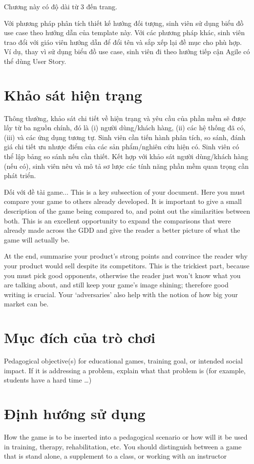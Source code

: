 \documentclass[../DoAn.tex]{subfiles}
\begin{document}
Chương này có độ dài từ 3 đến  trang.

Với phương pháp phân tích thiết kế hướng đối tượng, sinh viên sử dụng biểu đồ use case theo hướng dẫn của template này. Với các phương pháp khác, sinh viên trao đổi với giáo viên hướng dẫn để đổi tên và sắp xếp lại đề mục cho phù hợp. Ví dụ, thay vì sử dụng biểu đồ use case, sinh viên đi theo hướng tiếp cận Agile có thể dùng User Story.

\section{Khảo sát hiện trạng}
\label{section:2.1}
Thông thường, khảo sát chi tiết về hiện trạng và yêu cầu của phần mềm sẽ được lấy từ ba nguồn chính, đó là (i) người dùng/khách hàng, (ii) các hệ thống đã có, (iii) và các ứng dụng tương tự.
Sinh viên cần tiến hành phân tích, so sánh, đánh giá chi tiết ưu nhược điểm của các sản phẩm/nghiên cứu hiện có. Sinh viên có thể lập bảng so sánh nếu cần thiết. Kết hợp với khảo sát người dùng/khách hàng (nếu có), sinh viên nêu và mô tả sơ lược các tính năng phần mềm quan trọng cần phát triển.

Đối với đề tài game...
This is a key subsection of your document. Here you must compare your game to others already developed. It is important to give a small description of the game being compared to, and point out the similarities between both. This is an excellent opportunity to expand the comparisons that were already made across the GDD and give the reader a better picture of what the game will actually be.

At the end, summarise your product's strong points and convince the reader why your product would sell despite its competitors. This is the trickiest part, because you must pick good opponents, otherwise the reader just won't know what you are talking about, and still keep your game’s image shining; therefore good writing is crucial. Your ‘adversaries’ also help with the notion of how big your market can be.

\section{Mục đích của trò chơi}
\label{section:2.2}
Pedagogical objective(s) for educational games, training goal, or intended social impact. If it is addressing a problem, explain what that problem is (for example, students have a hard time …)

\section{Định hướng sử dụng}
\label{section:2.3}
How the game is to be inserted into a pedagogical scenario or how will it be used in training, therapy, rehabilitation, etc. You should distinguish between a game that is stand alone, a supplement to a class, or working with an instructor
\end{document}
